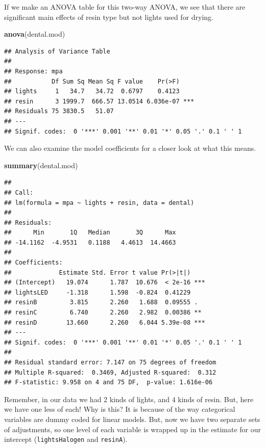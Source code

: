 \documentclass[
]{book}
\newenvironment{Shaded}{\begin{snugshade}}{\end{snugshade}}
\newcommand{\KeywordTok}[1]{\textcolor[rgb]{0.13,0.29,0.53}{\textbf{#1}}}
\newcommand{\NormalTok}[1]{#1}
\begin{document}
If we make an ANOVA table for this two-way ANOVA, we see that there are significant main effects of resin type but not lights used for drying.

\begin{Shaded}
\begin{Highlighting}[]
\KeywordTok{anova}\NormalTok{(dental.mod)}
\end{Highlighting}
\end{Shaded}

\begin{verbatim}
## Analysis of Variance Table
## 
## Response: mpa
##           Df Sum Sq Mean Sq F value    Pr(>F)    
## lights     1   34.7   34.72  0.6797    0.4123    
## resin      3 1999.7  666.57 13.0514 6.036e-07 ***
## Residuals 75 3830.5   51.07                      
## ---
## Signif. codes:  0 '***' 0.001 '**' 0.01 '*' 0.05 '.' 0.1 ' ' 1
\end{verbatim}

We can also examine the model coefficients for a closer look at what this means.

\begin{Shaded}
\begin{Highlighting}[]
\KeywordTok{summary}\NormalTok{(dental.mod)}
\end{Highlighting}
\end{Shaded}

\begin{verbatim}
## 
## Call:
## lm(formula = mpa ~ lights + resin, data = dental)
## 
## Residuals:
##      Min       1Q   Median       3Q      Max 
## -14.1162  -4.9531   0.1188   4.4613  14.4663 
## 
## Coefficients:
##             Estimate Std. Error t value Pr(>|t|)    
## (Intercept)   19.074      1.787  10.676  < 2e-16 ***
## lightsLED     -1.318      1.598  -0.824  0.41229    
## resinB         3.815      2.260   1.688  0.09555 .  
## resinC         6.740      2.260   2.982  0.00386 ** 
## resinD        13.660      2.260   6.044 5.39e-08 ***
## ---
## Signif. codes:  0 '***' 0.001 '**' 0.01 '*' 0.05 '.' 0.1 ' ' 1
## 
## Residual standard error: 7.147 on 75 degrees of freedom
## Multiple R-squared:  0.3469,	Adjusted R-squared:  0.312 
## F-statistic: 9.958 on 4 and 75 DF,  p-value: 1.616e-06
\end{verbatim}

Remember, in our data we had 2 kinds of lights, and 4 kinds of resin. But, here we have one less of each! Why is this? It is because of the way categorical variables are dummy coded for linear models. But, now we have two separate sets of adjustments, so one level of each variable is wrapped up in the estimate for our intercept (\texttt{lightsHalogen} and \texttt{resinA}).
\end{document}
